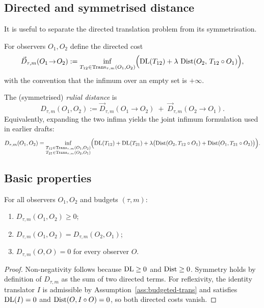 \documentclass{aion}
\begin{document}
\subsection{Directed and symmetrised distance}

It is useful to separate the directed translation problem from its symmetrisation.

\begin{definition}\label{def:directed}
For observers $O_1,O_2$ define the directed cost
\[
  \vec{D}_{\tau,m}(O_1\!\to\! O_2)
  :=
  \inf_{T_{12}\in\operatorname{Trans}_{\tau,m}(O_1,O_2)}
  \Bigl(\operatorname{DL}(T_{12}) + \lambda\,\operatorname{Dist}(O_2,\,T_{12}\circ O_1)\Bigr),
\]
with the convention that the infimum over an empty set is $+\infty$.
\end{definition}

\begin{definition}\label{def:rulial}
The (symmetrised) \emph{rulial distance} is
\[
  D_{\tau,m}(O_1,O_2)
  :=
  \vec{D}_{\tau,m}(O_1\!\to\! O_2)
  \;+\;
  \vec{D}_{\tau,m}(O_2\!\to\! O_1).
\]
Equivalently, expanding the two infima yields the joint infimum formulation used in earlier drafts:
\[
  D_{\tau,m}(O_1,O_2)
   = \inf_{\substack{
         T_{12}\in\operatorname{Trans}_{\tau,m}(O_1,O_2)\\
         T_{21}\in\operatorname{Trans}_{\tau,m}(O_2,O_1)}}
      \Bigl(
        \operatorname{DL}(T_{12}) + \operatorname{DL}(T_{21})
        + \lambda \bigl(
           \operatorname{Dist}(O_2, T_{12}\circ O_1) +
           \operatorname{Dist}(O_1, T_{21}\circ O_2)
        \bigr)
      \Bigr).
\]
\end{definition}

\subsection{Basic properties}

\begin{theorem}\label{thm:rulial-basic}
For all observers $O_1,O_2$ and budgets $(\tau,m)$:
\begin{enumerate}[leftmargin=*]
  \item $D_{\tau,m}(O_1,O_2)\ge 0$;
  \item $D_{\tau,m}(O_1,O_2)=D_{\tau,m}(O_2,O_1)$;
  \item $D_{\tau,m}(O,O)=0$ for every observer $O$.
\end{enumerate}
\end{theorem}

\begin{proof}
Non-negativity follows because $\operatorname{DL}\ge 0$ and $\operatorname{Dist}\ge 0$.
Symmetry holds by definition of $D_{\tau,m}$ as the sum of two directed terms.
For reflexivity, the identity translator $I$ is admissible by Assumption~\ref{ass:budgeted-trans} and
satisfies $\operatorname{DL}(I)=0$ and $\operatorname{Dist}(O,I\circ O)=0$, so both directed costs vanish.
\end{proof}
\end{document}
